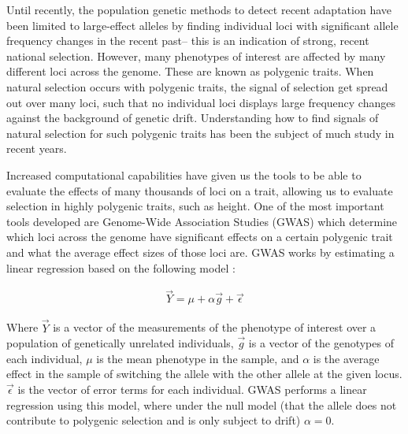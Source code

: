 \documentclass[a4paper,12pt]{article}
\begin{document}

Until recently, the population genetic methods to detect recent adaptation have been limited to
large-effect alleles by finding individual loci with significant
allele frequency changes in the recent past-- this is an indication of
strong, recent national selection. However, many phenotypes of interest
are affected by many different loci across the genome. These are known
as polygenic traits. When natural selection occurs with polygenic
traits, the signal of selection get spread out over many loci, such
that no individual loci displays large frequency changes against the
background of genetic drift.  Understanding
how to find signals of natural selection for such polygenic traits has been
the subject of much study in recent years.

Increased computational capabilities have given us the tools to be able to evaluate the effects
of many thousands of loci on a trait, allowing us to evaluate
selection in highly polygenic traits, such as height. One of the most
important tools developed are Genome-Wide Association Studies (GWAS)
which determine which loci across the genome have significant effects
on a certain polygenic trait \cite{gwasoverview} and what the average
effect sizes of those loci are. GWAS works by
estimating a linear regression based on the following model \cite{gwas}:

  \begin{align}
    \vec{Y} = \mu + \alpha \vec{g} + \vec{\epsilon}
  \end{align}

Where $\vec{Y}$ is a vector of the measurements of the phenotype of
interest over a population of genetically unrelated individuals,
$\vec{g}$ is a vector of the genotypes of each individual, $\mu$ is
the mean phenotype in the sample, and $\alpha$ is the average
effect in the sample of switching the allele with the
other allele at the given locus. $\vec{\epsilon}$ is the vector of
error terms for each individual. GWAS performs a linear regression
using this model, where under the null model (that the
allele does not contribute to polygenic selection and is only subject
to drift) $\alpha = 0$. 
\end{document}

